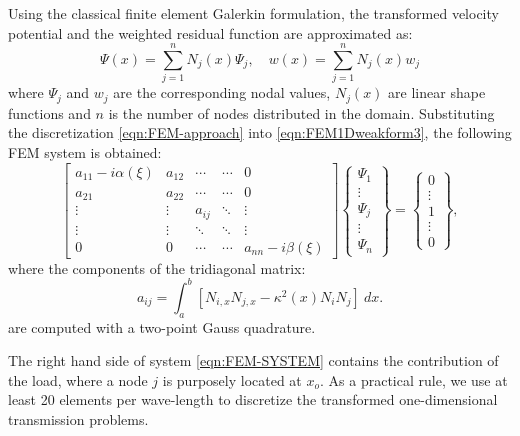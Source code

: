 Using the classical finite element Galerkin formulation, the transformed velocity potential and the weighted residual function are approximated as:
%
\begin{equation}
\label{eqn:FEM-approach}
\varPsi(x)= \sum_{j=1}^{n} N_{j}(x)\varPsi_{j}, \quad w(x) = \sum_{j=1}^{n} N_{j}(x) w_{j}
\end{equation}
%
where  $\varPsi_{j}$ and $w_{j}$ are the corresponding nodal values, $N_j(x)$ are linear shape functions and $n$ is the number of nodes distributed in the domain. Substituting the discretization \eqref{eqn:FEM-approach} into \eqref{eqn:FEM1Dweakform3}, the following FEM system is obtained:
%
\begin{equation}
\label{eqn:FEM-SYSTEM}
\left[
\begin{matrix}
a_{11}-i\alpha(\xi) & a_{12} & \cdots  &  \cdots  & 0 \\
a_{21} & a_{22} & \cdots  &  \cdots  & 0 \\
\vdots & \vdots & a_{ij}  &  \ddots  & \vdots\\
\vdots & \vdots &  \ddots &  \ddots  & \vdots\\
0 & 0 & \cdots  &  \cdots  & a_{n n}-i\beta(\xi)
 \end{matrix}
 \right]
 \left\lbrace 
 \begin{matrix}
 \varPsi_1 \\
 \vdots \\
 \varPsi_j\\
 \vdots \\
 \varPsi_{n}
 \end{matrix}
 \right\rbrace
 =
 \left\lbrace
 \begin{matrix}
 0\\
 \vdots\\
 1 \\
 \vdots\\
 0
 \end{matrix}
 \right\rbrace,
 \end{equation}
where the components of the tridiagonal matrix:
%
\begin{equation}
a_{ij} = \int_{a}^{b} \left[  N_{i,x}N_{j,x} - \kappa^{2}(x)  N_i N_j\right] \: dx.
\end{equation}
%
are computed with a two-point Gauss quadrature.

The right hand side of system \eqref{eqn:FEM-SYSTEM} contains the contribution of the load, where a node $j$ is purposely located at $x_o$. As a practical rule, we use at least 20 elements per wave-length to discretize the transformed one-dimensional transmission problems.


